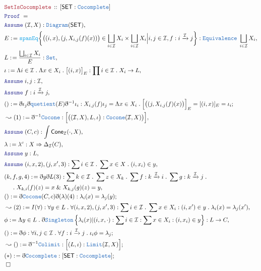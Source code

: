 \documentclass[12pt]{scrartcl}
\newcommand{\TYPE}[1]{\textcolor{NavyBlue}{\mathtt{#1}}}
\newcommand{\FUNC}[1]{\textcolor{Cerulean}{\mathtt{#1}}}
\newcommand{\LOGIC}[1]{\textcolor{Blue}{\mathtt{#1}}}
\newcommand{\THM}[1]{\textcolor{Maroon}{\mathtt{#1}}}
\renewcommand{\.}{\; . \;}
\newcommand{\de}{: \kern 0.1pc =}
\newcommand{\Theorem}[2]{& \THM{#1} \, :: \, #2 \\ & \Proof = \\ }
\newcommand{\NewLine}{\\ & \kern 1pc}
\newcommand{\Page}[1]{ \begin{align*} #1 \end{align*}   }
\newcommand{ \bd }{ \ByDef }
\renewcommand{\And}{\; \& \;}
\newcommand{\Arrow}{\xrightarrow}
\newcommand{\Set}{\TYPE{Set}}
\newcommand{\Say}[3]{& #1 \de #2 : #3, \\}
\newcommand{\Conclude}[3]{& #1 \de #2 : #3; \\}
\newcommand{\Derive}[3]{& \leadsto #1 \de #2 : #3, \\}
\newcommand{\DeriveConclude}[3]{& \leadsto #1 \de #2 : #3 ; \\}
\newcommand{\Assume}[2]{& \LOGIC{Assume} \; #1 : #2, \\}
\newcommand{\QED}{\; \square}
\newcommand{\EndProof}{& \QED \\}
\newcommand{\ByDef}{\eth}
\newcommand{\Proof}{\LOGIC{Proof} \; }
\newcommand{\I}{\mathcal{I}}
\newcommand{\SET}{\mathsf{SET}}
\begin{document}
\Page{
	\Theorem{SetIsCocomplete}{[\SET : \TYPE{Cocomplete}]}
	\Assume{(\I,X)}{\TYPE{Diagram}(\SET)}
	\Say{E}{ \FUNC{spanEq}
		\bigg\{ \big((i,x),(j,X_{i,j}(f)(x))\big) \in \bigsqcup_{i \in \I} X_i \times \bigsqcup_{i \in \I} X_i   
		\Big| i,j \in \I,  f : i \Arrow{\I} j   \bigg\}
	       }
		{  \TYPE{Equivalence} \; \bigsqcup_{i \in \I} X_i }
	\Say{L}{\frac{\bigsqcup_{i \in \I} X_i }{E}}{\Set}
	\Say{\iota}{\Lambda i \in \I \. \Lambda x \in X_i \. \big[(i,x)\big]_E}
	{ \prod i \in \I \. X_i \to L  }
	\Assume{i,j}{\I}
	\Assume{f}{i \Arrow{\I} j}
	\Conclude{()}{\bd \iota_j \bd\TYPE{quetient}(E) \bd^{-1} \iota_i}
	{ 
		X_{i,j}(f)\iota_j = 
		\Lambda x \in X_i \. \Big[\big((j,X_{i,j}(f)(x)\big)\Big]_E   = 
		[ (i,x) ]_E =
		\iota_i  
	} 
	\Derive{(1)}{\bd^{-1}\TYPE{Cocone}}{ \Big[ \big((\I,X),L,\iota\big) : \TYPE{Cocone}(\I,X) \big)\Big]   }
	\Assume{(C,c)}{\int \mathsf{Cone}_\I(\cdot,X)}
	\Say{\lambda}{\lambda^c}{  X \Rightarrow \Delta_\I(C)  }
	\Assume{y}{L}
	\Assume{(i,x,2),(j,x',3)}{ \sum i \in \I \. \sum  x \in X \. (i,x_i) \in y}
	\Say{(k,f,g,4)}{\bd y \bd L(3)}{ 
		\sum k \in \I \. \sum z \in X_k \. \sum  f : k \Arrow{\I} i \. \sum  g : k \Arrow{\I} j \. \NewLine \. 
		X_{k,i}(f)(z) = x \And  X_{k,j}(g)(z) = y 
	}
	\Conclude{()}{\bd \TYPE{Cocone}(C,c)\bd(\lambda)(4)}{ \lambda_i(x) = \lambda_j(y)}
	\Derive{(2)}{I(\forall)}{ \forall y  \in L  \. \forall (i,x,2),(j,x',3) : \sum i \in \I \. 
		\sum x \in X_i : (i,x') \in y \. \lambda_i(x)   = \lambda_j(x')  }
	\Say{\phi}{
		\Lambda y \in L  \. 
		\bd \TYPE{Singleton} \left\{ \lambda_i(x) 
		|  (i,x,\cdot) : \sum i \in \I : \sum x \in X_i : (i,x_i) \in y   \right\}  
	}
	{
                L \to C 
	}
	\Conclude{()}{\bd \phi}{\forall i,j \in \I \. \forall f : i \Arrow{\I} j \.  \iota_i \phi = \lambda_j}
	\DeriveConclude{()}{\bd^{-1} \TYPE{Colimit}}{\Big[(L,\iota) : \TYPE{Limit}(\I,X)\Big]}
	\Conclude{(*)}{\bd \TYPE{Cocomplete}}{[\SET : \TYPE{Cocomplete}]}
	\EndProof
}
\newpage
\end{document}
